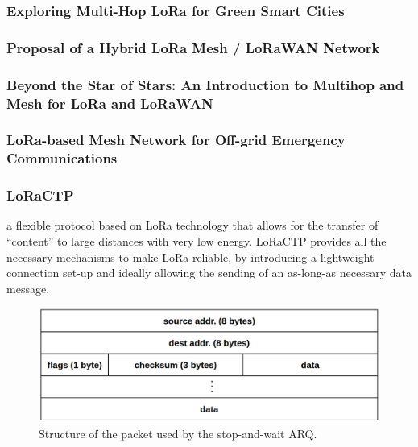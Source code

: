 			\subsubsection{Exploring Multi-Hop LoRa for Green Smart Cities}
			
			\subsubsection{Proposal of a Hybrid LoRa Mesh / LoRaWAN Network}
			
			\subsubsection{Beyond the Star of Stars: An Introduction to Multihop and Mesh for LoRa and LoRaWAN}
			
			\subsubsection{LoRa-based Mesh Network for Off-grid Emergency Communications}
			
			\subsubsection{LoRaCTP}
			
				a ﬂexible protocol based
				on LoRa technology that allows for the transfer of “content” to
				large distances with very low energy. LoRaCTP provides all the
				necessary mechanisms to make LoRa reliable, by introducing a
				lightweight connection set-up and ideally allowing the sending
				of an as-long-as necessary data message.
			
				\begin{figure}[H]
					\centering
					\includegraphics[width=.75\textwidth]{resources/img/chap4/loractp_packet}
					\caption[Flow of the establishment and interchange of data in LoRaCTP]{Structure of the packet used by the stop-and-wait ARQ. \cite{loractp}}
				\end{figure}
			
